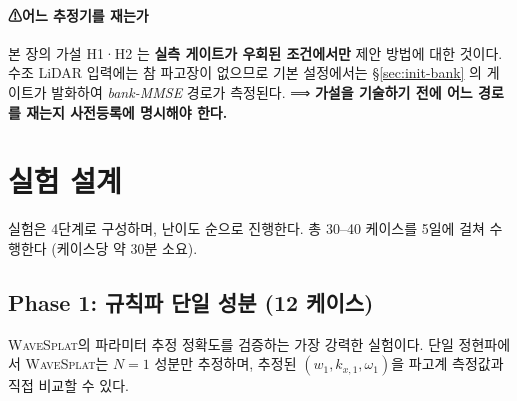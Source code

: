 \documentclass[11pt]{report}
\numberwithin{equation}{chapter}
\numberwithin{figure}{chapter}
\numberwithin{table}{chapter}
\newcommand{\WS}{\textsc{WaveSplat}}
\begin{document}
\paragraph{⚠어느 추정기를 재는가}
본 장의 가설 H1·H2 는 \textbf{실측 게이트가 우회된 조건에서만} 제안 방법에 대한
것이다. 수조 LiDAR 입력에는 참 파고장이 없으므로 기본 설정에서는
\S\ref{sec:init-bank} 의 게이트가 발화하여 \emph{bank-MMSE} 경로가 측정된다.
⟹ \textbf{가설을 기술하기 전에 어느 경로를 재는지 사전등록에 명시해야 한다.}

\section{실험 설계}
\label{sec:tank_design}

실험은 4단계로 구성하며, 난이도 순으로 진행한다.
총 30--40 케이스를 5일에 걸쳐 수행한다 (케이스당 약 30분 소요).

\subsection{Phase 1: 규칙파 단일 성분 (12 케이스)}
\label{sec:tank_phase1}

\WS{}의 파라미터 추정 정확도를 검증하는 가장 강력한 실험이다.
단일 정현파에서 \WS{}는 $N=1$ 성분만 추정하며,
추정된 $(w_1, k_{x,1}, \omega_1)$을 파고계 측정값과 직접 비교할 수 있다.
\end{document}
